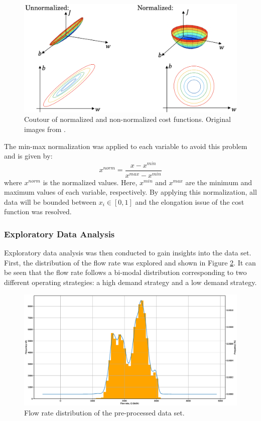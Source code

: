 \begin{figure}[h]
    \centering
    \includegraphics[width=.8\textwidth]{images/suncor/08featscale.png}
    \caption{Coutour of normalized and non-normalized cost functions. Original images from \cite{deeplearning_course}.}
    \label{fig:08featscale}
\end{figure}

The min-max normalization was applied to each variable to avoid this problem and is given by:
\begin{equation}
    x^{norm} = \frac{x - x^{min}}{x^{max} - x^{min}}
    \label{eq:08normalization}
\end{equation}
where $x^{norm}$ is the normalized values.  Here, $x^{min}$ and $x^{max}$ are the minimum and maximum values of each variable, respectively.  By applying this normalization, all data will be bounded between $x_i \in [0, 1]$ and the elongation issue of the cost function was resolved.

\subsubsection{Exploratory Data Analysis}
Exploratory data analysis was then conducted to gain insights into the data set.  First, the distribution of the flow rate was explored and shown in Figure \ref{fig:08flowrate_dist}.  It can be seen that the flow rate follows a bi-modal distribution corresponding to two different operating strategies: a high demand strategy and a low demand strategy.

\begin{figure}[h]
    \centering
    \includegraphics[scale=0.35]{images/suncor/08Flowrate_KDE.eps}
    \caption{Flow rate distribution of the pre-processed data set.}
    \label{fig:08flowrate_dist}
\end{figure}

